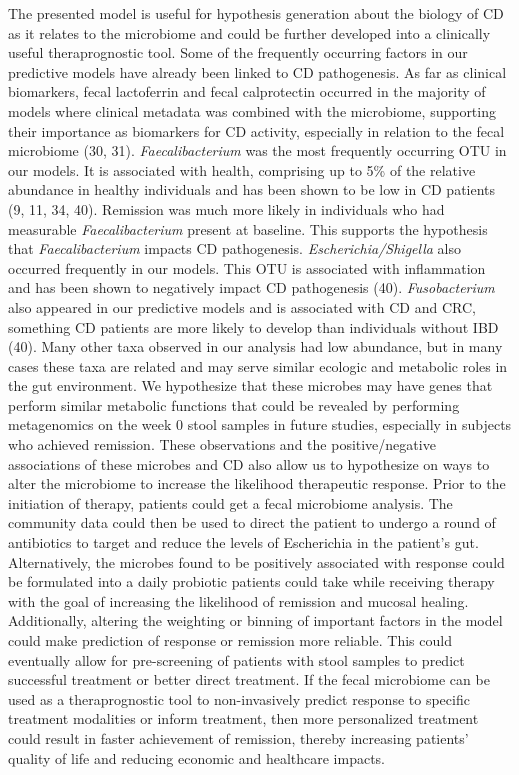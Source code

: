 \documentclass[11pt,]{article}
\begin{document}
The presented model is useful for hypothesis generation about the
biology of CD as it relates to the microbiome and could be further
developed into a clinically useful theraprognostic tool. Some of the
frequently occurring factors in our predictive models have already been
linked to CD pathogenesis. As far as clinical biomarkers, fecal
lactoferrin and fecal calprotectin occurred in the majority of models
where clinical metadata was combined with the microbiome, supporting
their importance as biomarkers for CD activity, especially in relation
to the fecal microbiome (30, 31). \emph{Faecalibacterium} was the most
frequently occurring OTU in our models. It is associated with health,
comprising up to 5\% of the relative abundance in healthy individuals
and has been shown to be low in CD patients (9, 11, 34, 40). Remission
was much more likely in individuals who had measurable
\emph{Faecalibacterium} present at baseline. This supports the
hypothesis that \emph{Faecalibacterium} impacts CD pathogenesis.
\emph{Escherichia/Shigella} also occurred frequently in our models. This
OTU is associated with inflammation and has been shown to negatively
impact CD pathogenesis (40). \emph{Fusobacterium} also appeared in our
predictive models and is associated with CD and CRC, something CD
patients are more likely to develop than individuals without IBD (40).
Many other taxa observed in our analysis had low abundance, but in many
cases these taxa are related and may serve similar ecologic and
metabolic roles in the gut environment. We hypothesize that these
microbes may have genes that perform similar metabolic functions that
could be revealed by performing metagenomics on the week 0 stool samples
in future studies, especially in subjects who achieved remission. These
observations and the positive/negative associations of these microbes
and CD also allow us to hypothesize on ways to alter the microbiome to
increase the likelihood therapeutic response. Prior to the initiation of
therapy, patients could get a fecal microbiome analysis. The community
data could then be used to direct the patient to undergo a round of
antibiotics to target and reduce the levels of Escherichia in the
patient's gut. Alternatively, the microbes found to be positively
associated with response could be formulated into a daily probiotic
patients could take while receiving therapy with the goal of increasing
the likelihood of remission and mucosal healing. Additionally, altering
the weighting or binning of important factors in the model could make
prediction of response or remission more reliable. This could eventually
allow for pre-screening of patients with stool samples to predict
successful treatment or better direct treatment. If the fecal microbiome
can be used as a theraprognostic tool to non-invasively predict response
to specific treatment modalities or inform treatment, then more
personalized treatment could result in faster achievement of remission,
thereby increasing patients' quality of life and reducing economic and
healthcare impacts.
\end{document}
